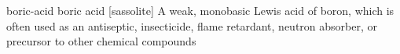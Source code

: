 \newglsXchemical%
{boric-acid}%
{boric acid}%
[sassolite]%
{}%
{A weak, monobasic Lewis acid of boron, which is often used as an antiseptic, insecticide, flame retardant, neutron absorber, or precursor to other chemical compounds}%